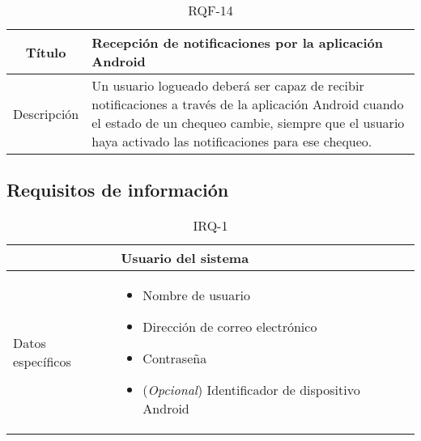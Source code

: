 \begin{table}[h!]
  \centering
  \begin{tabularx}{\textwidth}{|c|X|}
    \hline
    Título & Recepción de notificaciones por la aplicación Android \\

    \hline

    Descripción & Un usuario logueado deberá ser capaz de recibir notificaciones
    a través de la aplicación Android cuando el estado de un chequeo cambie,
    siempre que el usuario haya activado las notificaciones para ese
    chequeo. \\

    \hline
  \end{tabularx}
  \caption{RQF-14}
\end{table}

\FloatBarrier
\subsection{Requisitos de información}
\label{sec:requisitos-informacion}


\begin{table}[h!]
  \centering
  \begin{tabularx}{\textwidth}{|l|X|}
    \hline

    & Usuario del sistema\\

    \hline
    Datos específicos &

    \begin{itemize}
    \item Nombre de usuario
    \item Dirección de correo electrónico
    \item Contraseña
    \item (\textit{Opcional}) Identificador de dispositivo Android
    \end{itemize}
    \\
    
    \hline
    
  \end{tabularx}
  \caption{IRQ-1}
\end{table}


